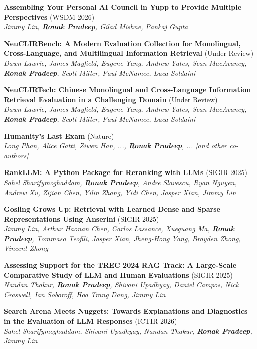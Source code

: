 \documentclass[letterpaper,12pt]{article}
\newcommand{\resumeItem}[0]{
  \item\small{ \vspace{-2pt}
  }
}
\begin{document}
  \resumeItem{\textbf{Assembling Your Personal AI Council in Yupp to Provide Multiple Perspectives} (WSDM 2026)}\\
\textit{Jimmy Lin, \textbf{Ronak Pradeep}, Gilad Mishne, Pankaj Gupta}

  \resumeItem{\textbf{NeuCLIRBench: A Modern Evaluation Collection for Monolingual, Cross-Language, and Multilingual Information Retrieval} (Under Review)}\\
\textit{Dawn Lawrie, James Mayfield, Eugene Yang, Andrew Yates, Sean MacAvaney, \textbf{Ronak Pradeep}, Scott Miller, Paul McNamee, Luca Soldaini}

  \resumeItem{\textbf{NeuCLIRTech: Chinese Monolingual and Cross-Language Information Retrieval Evaluation in a Challenging Domain} (Under Review)}\\
\textit{Dawn Lawrie, James Mayfield, Eugene Yang, Andrew Yates, Sean MacAvaney, \textbf{Ronak Pradeep}, Scott Miller, Paul McNamee, Luca Soldaini}

\resumeItem{\textbf{Humanity's Last Exam} (Nature)}\\
\textit{Long Phan, Alice Gatti, Ziwen Han, ..., \textbf{Ronak Pradeep}, ... [and other co-authors]}

  \resumeItem{\textbf{RankLLM: A Python Package for Reranking with LLMs} (SIGIR 2025)}\\
\textit{Sahel Sharifymoghaddam, \textbf{Ronak Pradeep}, Andre Slavescu, Ryan Nguyen, Andrew Xu, Zijian Chen, Yilin Zhang, Yidi Chen, Jasper Xian, Jimmy Lin}

  \resumeItem{\textbf{Gosling Grows Up: Retrieval with Learned Dense and Sparse Representations Using Anserini} (SIGIR 2025)}\\
\textit{Jimmy Lin, Arthur Haonan Chen, Carlos Lassance, Xueguang Ma, \textbf{Ronak Pradeep}, Tommaso Teofili, Jasper Xian, Jheng-Hong Yang, Brayden Zhong, Vincent Zhong}

  \resumeItem{\textbf{Assessing Support for the TREC 2024 RAG Track: A Large-Scale Comparative Study of LLM and Human Evaluations} (SIGIR 2025)}\\
\textit{Nandan Thakur, \textbf{Ronak Pradeep}, Shivani Upadhyay, Daniel Campos, Nick Craswell, Ian Soboroff, Hoa Trang Dang, Jimmy Lin}

  \resumeItem{\textbf{Search Arena Meets Nuggets: Towards Explanations and Diagnostics in the Evaluation of LLM Responses} (ICTIR 2026)}\\
\textit{Sahel Sharifymoghaddam, Shivani Upadhyay, Nandan Thakur, \textbf{Ronak Pradeep}, Jimmy Lin}
\end{document}

